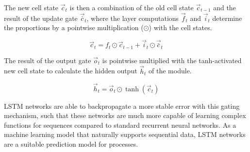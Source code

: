 The new cell state $\vec{c}_t$ is then a combination of the old cell state $\vec{c}_{t-1}$ and the result of the update gate $\vec{\bar{c}}_t$, where the layer computations $\vec{f}_t$ and $\vec{i}_t$ determine the proportions by a pointwise multiplication ($\odot$) with the cell states.

\begin{equation*}
	\vec{c}_t = f_t \odot \vec{c}_{t-1} + \vec{i}_t \odot \vec{\bar{c}}_t
\end{equation*}

The result of the output gate $\vec{o}_t$ is pointwise multiplied with the tanh-activated new cell state to calculate the hidden output $\vec{h}_t$ of the module.

\begin{equation*}
	\vec{h}_t = \vec{o}_t \odot \tanh(\vec{c}_t )
\end{equation*}

LSTM networks are able to backpropagate a more stable error with this gating mechanism, such that these networks are much more capable of learning complex functions for sequences compared to standard recurrent neural networks.
As a machine learning model that naturally supports sequential data, LSTM networks are a suitable prediction model for processes.